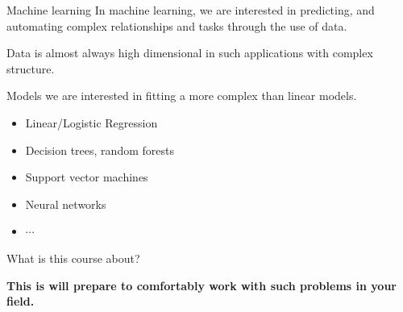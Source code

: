 \documentclass[aspectratio=169]{beamer}
\let\olditem\item
\renewcommand{\item}{\setlength{\itemsep}{\fill}\olditem}
\begin{document}
\begin{frame}{Machine learning}
  In machine learning, we are interested in predicting, and automating complex relationships and tasks through the use of data.
  \vspace{0.5cm}
  
  Data is almost always high dimensional in such applications with complex structure.
  \vspace{0.5cm}
  
  Models we are interested in fitting a more complex than linear models.
  \begin{itemize}
    \item Linear/Logistic Regression
    \item Decision trees, random forests
    \item Support vector machines
    \item Neural networks
    \item $\cdots$
  \end{itemize}
\end{frame}


\begin{frame}[t]{What is this course about?}
  \vspace{2cm}
  \begin{center}
    \textcolor{myred}{\huge \textbf{This is will prepare to comfortably work with such problems in your field.}}
  \end{center}
\end{frame}
\end{document}

